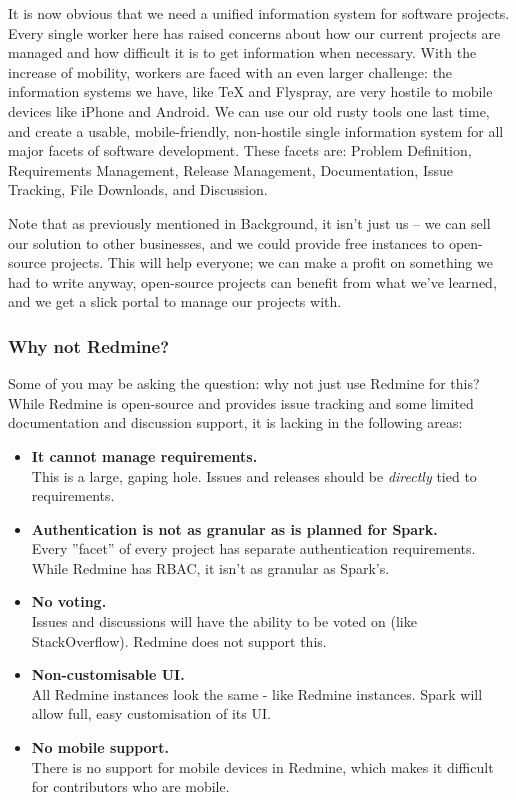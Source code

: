It is now obvious that we need a unified information system for software projects. Every single worker here has raised concerns about how our current projects are managed and how difficult it is to get information when necessary. With the increase of mobility, workers are faced with an even larger challenge: the information systems we have, like TeX and Flyspray, are very hostile to mobile devices like iPhone and Android. We can use our old rusty tools one last time, and create a usable, mobile-friendly, non-hostile single information system for all major facets of software development. These facets are: Problem Definition, Requirements Management, Release Management, Documentation, Issue Tracking, File Downloads, and Discussion.

Note that as previously mentioned in Background, it isn’t just us -- we can sell our solution to other businesses, and we could provide free instances to open-source projects. This will help everyone; we can make a profit on something we had to write anyway, open-source projects can benefit from what we’ve learned, and we get a slick portal to manage our projects with.

\subsubsection{Why not Redmine?}
Some of you may be asking the question: why not just use Redmine for this? While Redmine is open-source and provides issue tracking and some limited documentation and discussion support, it is lacking in the following areas:

\begin{itemize}
\item{\textbf{It cannot manage requirements.} \\
	This is a large, gaping hole. Issues and releases should be \textit{directly} tied to requirements.}
\item{\textbf{Authentication is not as granular as is planned for Spark.} \\
	Every ”facet” of every project has separate authentication requirements. While Redmine has RBAC, it isn’t as granular as Spark’s.}
\item{\textbf{No voting.} \\
	Issues and discussions will have the ability to be voted on (like StackOverflow). Redmine does not support this.}
\item{\textbf{Non-customisable UI.} \\
	All Redmine instances look the same - like Redmine instances. Spark will allow full, easy customisation of its UI.}
\item{\textbf{No mobile support.} \\
	There is no support for mobile devices in Redmine, which makes it difficult for contributors who are mobile.}
\end{itemize}


